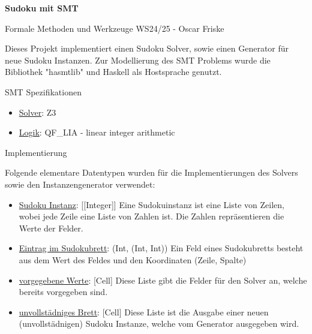 

\usepackage{listings}



\begin{Large}
    \textsf{\textbf{Sudoku mit SMT}}

    Formale Methoden und Werkzeuge WS24/25 - Oscar Friske
\end{Large}
\vspace{2ex}

Dieses Projekt implementiert einen Sudoku Solver, sowie einen Generator für neue Sudoku Instanzen. Zur Modellierung des SMT Problems wurde die Bibliothek "hasmtlib" und Haskell als Hostsprache genutzt.

\vspace{2ex}

\begin{Large}
    SMT Spezifikationen
\end{Large}
\begin{itemize}
  \item \underline{Solver}: Z3
  \item \underline{Logik}: QF\_LIA - linear integer arithmetic \newline
\end{itemize}
\vspace{2ex}

\begin{Large}
    Implementierung
\end{Large}
\vspace{2ex}

Folgende elementare Datentypen wurden für die Implementierungen des Solvers sowie den Instanzengenerator verwendet:
\begin{itemize}
    \item \underline{Sudoku Instanz}: [[Integer]] \newline
    Eine Sudokuinstanz ist eine Liste von Zeilen, wobei jede Zeile eine Liste von Zahlen ist. Die Zahlen repräsentieren die Werte der Felder.
    \item \underline{Eintrag im Sudokubrett}: (Int, (Int, Int)) \newline
    Ein Feld eines Sudokubretts besteht aus dem Wert des Feldes und den Koordinaten (Zeile, Spalte)
    \item \underline{vorgegebene Werte}: [Cell] \newline
    Diese Liste gibt die Felder für den Solver an, welche bereits vorgegeben sind.
    \item \underline{unvollstädniges Brett}: [Cell] \newline
    Diese Liste ist die Ausgabe einer neuen (unvollstädnigen) Sudoku Instanze, welche vom Generator ausgegeben wird.
\end{itemize}

